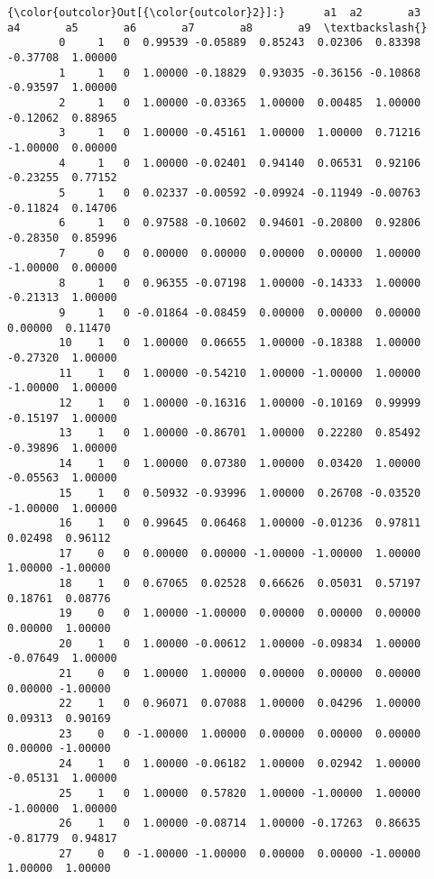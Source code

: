 \documentclass[11pt]{article}
\begin{document}
\begin{Verbatim}[commandchars=\\\{\}]
{\color{outcolor}Out[{\color{outcolor}2}]:}      a1  a2       a3       a4       a5       a6       a7       a8       a9  \textbackslash{}
        0     1   0  0.99539 -0.05889  0.85243  0.02306  0.83398 -0.37708  1.00000   
        1     1   0  1.00000 -0.18829  0.93035 -0.36156 -0.10868 -0.93597  1.00000   
        2     1   0  1.00000 -0.03365  1.00000  0.00485  1.00000 -0.12062  0.88965   
        3     1   0  1.00000 -0.45161  1.00000  1.00000  0.71216 -1.00000  0.00000   
        4     1   0  1.00000 -0.02401  0.94140  0.06531  0.92106 -0.23255  0.77152   
        5     1   0  0.02337 -0.00592 -0.09924 -0.11949 -0.00763 -0.11824  0.14706   
        6     1   0  0.97588 -0.10602  0.94601 -0.20800  0.92806 -0.28350  0.85996   
        7     0   0  0.00000  0.00000  0.00000  0.00000  1.00000 -1.00000  0.00000   
        8     1   0  0.96355 -0.07198  1.00000 -0.14333  1.00000 -0.21313  1.00000   
        9     1   0 -0.01864 -0.08459  0.00000  0.00000  0.00000  0.00000  0.11470   
        10    1   0  1.00000  0.06655  1.00000 -0.18388  1.00000 -0.27320  1.00000   
        11    1   0  1.00000 -0.54210  1.00000 -1.00000  1.00000 -1.00000  1.00000   
        12    1   0  1.00000 -0.16316  1.00000 -0.10169  0.99999 -0.15197  1.00000   
        13    1   0  1.00000 -0.86701  1.00000  0.22280  0.85492 -0.39896  1.00000   
        14    1   0  1.00000  0.07380  1.00000  0.03420  1.00000 -0.05563  1.00000   
        15    1   0  0.50932 -0.93996  1.00000  0.26708 -0.03520 -1.00000  1.00000   
        16    1   0  0.99645  0.06468  1.00000 -0.01236  0.97811  0.02498  0.96112   
        17    0   0  0.00000  0.00000 -1.00000 -1.00000  1.00000  1.00000 -1.00000   
        18    1   0  0.67065  0.02528  0.66626  0.05031  0.57197  0.18761  0.08776   
        19    0   0  1.00000 -1.00000  0.00000  0.00000  0.00000  0.00000  1.00000   
        20    1   0  1.00000 -0.00612  1.00000 -0.09834  1.00000 -0.07649  1.00000   
        21    0   0  1.00000  1.00000  0.00000  0.00000  0.00000  0.00000 -1.00000   
        22    1   0  0.96071  0.07088  1.00000  0.04296  1.00000  0.09313  0.90169   
        23    0   0 -1.00000  1.00000  0.00000  0.00000  0.00000  0.00000 -1.00000   
        24    1   0  1.00000 -0.06182  1.00000  0.02942  1.00000 -0.05131  1.00000   
        25    1   0  1.00000  0.57820  1.00000 -1.00000  1.00000 -1.00000  1.00000   
        26    1   0  1.00000 -0.08714  1.00000 -0.17263  0.86635 -0.81779  0.94817   
        27    0   0 -1.00000 -1.00000  0.00000  0.00000 -1.00000  1.00000  1.00000   

\end{Verbatim}
\end{document}
